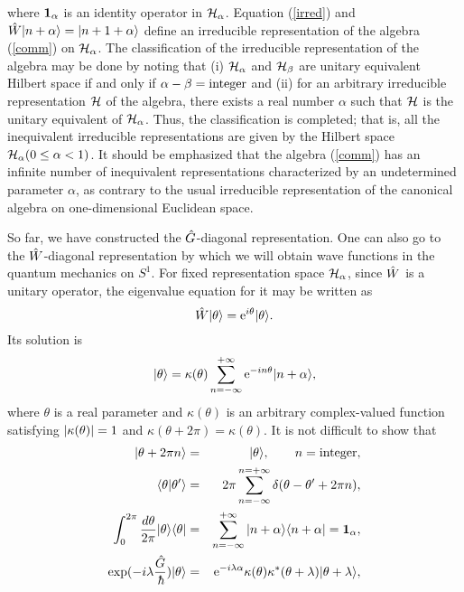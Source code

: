 \documentclass[a4paper,12pt]{article}
\begin{document}
where ${\bf 1}_{\alpha}$ is an identity operator in ${\cal H}_{\alpha}$.
Equation (\ref{irred}) and $\hat W|{n+\alpha}\rangle=|{n+1+\alpha}\rangle$ define 
an irreducible representation of the algebra (\ref{comm}) 
on ${\cal H}_{\alpha}$. The classification of the irreducible 
representation of the algebra may be done 
by noting that (i) ${\cal H}_{\alpha}$ and 
${\cal H}_{\beta}$ are unitary equivalent 
Hilbert space if and only if $\alpha - \beta ={\rm integer}$ and (ii)
for an arbitrary irreducible representation $\cal H$ of the algebra, 
there exists a real number $\alpha$ such that $\cal H$ is 
the unitary equivalent of ${\cal H}_{\alpha}$.     
Thus, the classification is completed; that is, all the inequivalent 
irreducible representations 
are given by the Hilbert space ${\cal H}_{\alpha} (0 \leq \alpha < 1)$.
It should be emphasized that the algebra (\ref{comm}) 
has an infinite number of inequivalent representations characterized 
by an undetermined parameter $\alpha$, as contrary to the usual 
irreducible representation of the canonical algebra on 
one-dimensional Euclidean space.
\par
So far, we have constructed the $\hat G$-diagonal representation. One can also 
go to the $\hat W$-diagonal representation by which we will obtain wave functions
in the quantum mechanics on $S^1$. For fixed representation 
space ${\cal H}_{\alpha}$, since $\hat W$ is a unitary operator, the eigenvalue 
equation for it may be written as 
\begin{equation}
\hat W |{\theta}\rangle= {\rm e}^{i\theta}|{\theta}\rangle.
\label{eigen}
\end{equation}   
Its solution is
\begin{equation}
|{\theta}\rangle = \kappa(\theta)\sum_{n=-\infty}^{+\infty}
{\rm e}^{-i n \theta}|{n+\alpha}\rangle,
\end{equation}
where $\theta$ is a real parameter and $\kappa(\theta)$ is an arbitrary
complex-valued function satisfying 
${\left|{\kappa(\theta)}\right|}=1$ and $\kappa(\theta+2\pi)=\kappa(\theta)$.
It is not difficult to show that 
\begin{eqnarray}
\ket{\theta+2\pi n}&=&\ket{\theta}, \qquad n={\rm integer},
\label{period}\\
\norm{\theta}{\theta^{\prime}}&=&2\pi \sum_{n=-\infty}^{n=+\infty}
\delta(\theta-\theta^{\prime}+2\pi n),
\label{ortho}\\
\int_0^{2\pi}{{d\theta}\over {2\pi}}\ket{\theta}\bra{\theta}&=&
\sum_{n=-\infty}^{+\infty}\ket{n+\alpha}\bra{n+\alpha}={\bf 1}_{\alpha},
\label{compl}\\
{\rm exp}(-i\lambda{\hg\over\hbar})\ket{\theta}&=&
\e^{-i\lambda\alpha}\kappa(\theta)\kappa^*(\theta+\lambda)
\ket{\theta+\lambda}, 
\label{trans}
\end{eqnarray}
\end{document}
